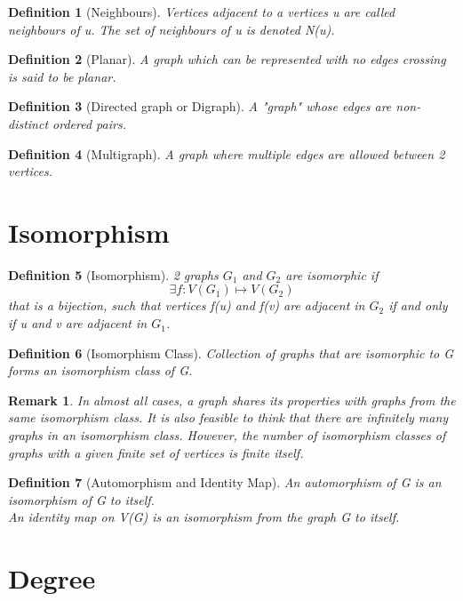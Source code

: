 \documentclass[11pt, oneside]{book}
\theoremstyle{break}
\newtheorem{defn}{Definition}[section]
\newtheorem*{remark}{Remark}
\begin{document}
\begin{defn}[Neighbours]
	Vertices adjacent to a vertices u are called neighbours of u. The set of neighbours of u is denoted N(u).
\end{defn}

\begin{defn}[Planar]
	A graph which can be represented with no edges crossing is said to be planar.
\end{defn}

\begin{defn}[Directed graph or Digraph]
	A "graph" whose edges are non-distinct ordered pairs.
\end{defn}

\begin{defn}[Multigraph]
	A graph where multiple edges are allowed between 2 vertices.
\end{defn}


\section{Isomorphism}

\begin{defn}[Isomorphism]
	2 graphs $G_1$ and $G_2$ are isomorphic if
	\[
		\exists f:V(G_1) \mapsto V(G_2)
	\]
	that is a bijection, such that vertices f(u) and f(v) are adjacent in $G_2$ if and only if u and v are adjacent in $G_1$.
\end{defn}

\begin{defn}[Isomorphism Class]
	Collection of graphs that are isomorphic to G forms an isomorphism class of G.
\end{defn}

\begin{remark}
	In almost all cases, a graph shares its properties with graphs from the same isomorphism class. It is also feasible to think that there are infinitely many graphs in an isomorphism class. However, the number of isomorphism classes of graphs with a given finite set of vertices is finite itself.
\end{remark}

\begin{defn}[Automorphism and Identity Map]
	An automorphism of G is an isomorphism of G to itself. \\
	An identity map on V(G) is an isomorphism from the graph G to itself.
\end{defn}


\section{Degree}
\end{document}
